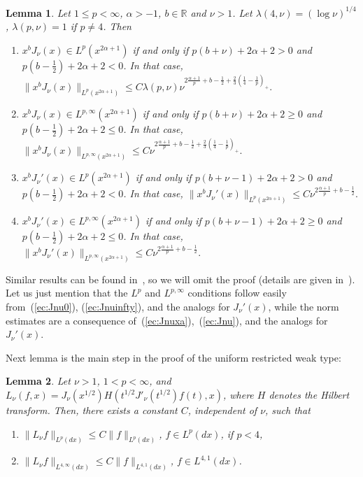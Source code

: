 \documentclass{amsart}
\theoremstyle{plain}
\newtheorem{lemma}{Lemma}
\begin{document}
\begin{lemma}
\label{lema:JnuLp}
Let $1 \leq p < \infty$, $\alpha > -1$, $b \in \mathbb{R}$ and $\nu > 1$. Let
$\lambda(4,\nu) = (\log \nu)^{1/4}$, $\lambda(p,\nu) = 1$ if $p \not= 4$.
Then
\begin{enumerate}
\item[(a)]
$x^b J_\nu(x) \in L^p(x^{2\alpha+1})$ if and only if
$p (b + \nu) + 2\alpha + 2 > 0$ and $p (b-\frac{1}{2}) + 2\alpha + 2 < 0$.
In that case,
$
   \| x^b J_\nu(x) \|_{L^p(x^{2\alpha+1})}
   \leq C \lambda(p,\nu)
   \nu^{2\frac{\alpha+1}{p} + b - \frac{1}{2}
   + \frac{2}{3} (\frac{1}{4} - \frac{1}{p})_+}.
$
\item[(b)]
$x^b J_\nu(x) \in L^{p,\infty}(x^{2\alpha+1})$ if and only if
$p (b + \nu) + 2\alpha + 2 \geq 0$ and $p (b-\frac{1}{2}) + 2\alpha + 2 \leq
0$.
In that case, 
$
   \| x^b J_\nu(x) \|_{L^{p,\infty}(x^{2\alpha+1})}
   \leq C \nu^{2\frac{\alpha+1}{p} + b - \frac{1}{2}
   + \frac{2}{3} (\frac{1}{4} - \frac{1}{p})_+}.
$
\item[(c)]
$x^b J_\nu'(x) \in L^p(x^{2\alpha+1})$ if and only if
$p (b + \nu - 1) + 2\alpha + 2 > 0$ and $p (b-\frac{1}{2}) + 2\alpha + 2 < 0$.
In that case, 
$
   \| x^b J_\nu'(x) \|_{L^p(x^{2\alpha+1})}
   \leq C \nu^{2\frac{\alpha+1}{p} + b - \frac{1}{2}}.
$
\item[(d)]
$x^b J_\nu'(x) \in L^{p,\infty}(x^{2\alpha+1})$ if and only if
$p (b + \nu - 1) + 2\alpha + 2 \geq 0$ and $p (b-\frac{1}{2}) + 2\alpha + 2
\leq 0$.
In that case,
$
   \| x^b J_\nu'(x) \|_{L^{p,\infty}(x^{2\alpha+1})}
   \leq C \nu^{2\frac{\alpha+1}{p} + b - \frac{1}{2}}.
$
\end{enumerate}
\end{lemma}

Similar results can be found in~\cite{BC, S}, so we will omit the proof
(details are given in~\cite[Chapter~2]{Ci}). Let us just mention that the
$L^p$ and $L^{p,\infty}$ conditions follow easily from~(\ref{ec:Jnu0}),
(\ref{ec:Jnuinfty}), and the analogs for $J_\nu'(x)$, while the norm estimates
are a consequence of~(\ref{ec:Jnuxa}),~(\ref{ec:Jnu}), and the analogs for
$J_\nu'(x)$.

Next lemma is the main step in the proof of the uniform restricted weak type:

\begin{lemma}
\label{lema:Lnu}
Let $\nu>1$, $1<p<\infty$, and
$L_\nu(f,x) = J_{\nu}(x^{1/2})H(t^{1/2} J'_{\nu}(t^{1/2})f(t),x)$,
where $H$ denotes the Hilbert transform.
Then, there exists a constant $C$, independent of $\nu$, such that
\begin{enumerate}
\item[(a)]
$\|L_\nu f\|_{L^p(dx)} \le C \|f\|_{L^p(dx)}$, $f\in L^p(dx)$, if $p<4$,
\item[(b)]
$\|L_\nu f\|_{L^{4,\infty}(dx)} \le C \|f\|_{L^{4,1}(dx)}$, $f\in
L^{4,1}(dx)$.
\end{enumerate}
\end{lemma}
\end{document}
